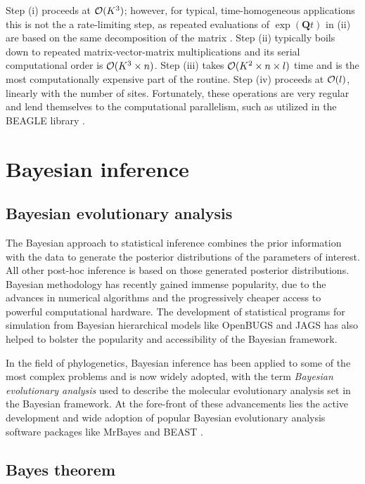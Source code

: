 Step (i) proceeds at ${\cal{O}}(K^3)$; however, for typical, time-homogeneous applications this is not the a rate-limiting step, as repeated evaluations of $\exp(\mathbf{Q}t)$ in (ii) are based on the same decomposition of the matrix \citep{Suchard2009}. 
Step (ii) typically boils down to repeated matrix-vector-matrix multiplications and its serial computational order is ${\cal{O}}(K^3 \times n)$. 
Step (iii) takes ${\cal{O}}(K^2 \times n \times l)$ time and is the most computationally expensive part of the routine. 
Step (iv) proceeds at ${\cal{O}}(l)$, linearly with the number of sites.
Fortunately, these operations are very regular and lend themselves to the computational parallelism, such as utilized in the BEAGLE library \citep{Suchard2009,Ayres2012}.


\section{Bayesian inference}

\subsection{Bayesian evolutionary analysis}

The Bayesian approach to statistical inference combines the prior information with the data to generate the posterior distributions of the parameters of interest.
All other post-hoc inference is based on those generated posterior distributions.
Bayesian methodology has recently gained immense popularity, due to the advances in numerical algorithms and the progressively cheaper access to powerful computational hardware.
The development of statistical programs for simulation from Bayesian hierarchical models like OpenBUGS \citep{Lunn2009} and JAGS \citep{Plummer2003} has also helped to bolster the popularity and accessibility of the Bayesian framework.

In the field of phylogenetics, Bayesian inference has been applied to some of the most complex problems and is now widely adopted, with the term \emph{Bayesian evolutionary analysis} used to describe the molecular evolutionary analysis set in the Bayesian framework.
At the fore-front of these advancements lies the active development and wide adoption of popular Bayesian evolutionary analysis software packages like MrBayes \citep{Ronquist2012} and BEAST \citep{Drummond2012}.

\subsection{Bayes theorem\label{sub:bayesTheorem}}

